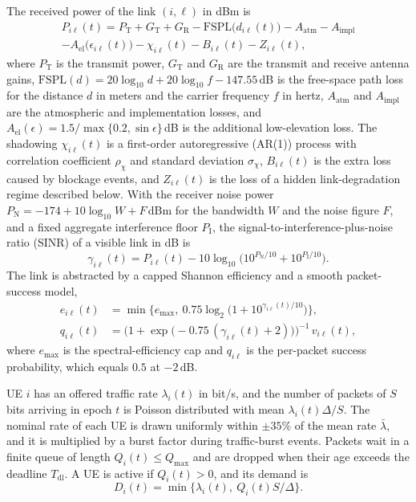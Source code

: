 \documentclass[journal]{IEEEtran}
\begin{document}
The received power of the link $(i,\ell)$ in dBm is
\begin{multline}
P_{i\ell}(t) = P_{\mathrm{T}} + G_{\mathrm{T}} + G_{\mathrm{R}}
 - \mathrm{FSPL}\big(d_{i\ell}(t)\big) - A_{\mathrm{atm}} - A_{\mathrm{impl}} \\
 - A_{\mathrm{el}}\big(\epsilon_{i\ell}(t)\big) - \chi_{i\ell}(t) - B_{i\ell}(t) - Z_{i\ell}(t),
\label{eq:rx}
\end{multline}
where $P_{\mathrm{T}}$ is the transmit power, $G_{\mathrm{T}}$ and
$G_{\mathrm{R}}$ are the transmit and receive antenna gains,
$\mathrm{FSPL}(d)=20\log_{10}d+20\log_{10}f-147.55$\,dB is the free-space
path loss for the distance $d$ in meters and the carrier frequency $f$ in
hertz, $A_{\mathrm{atm}}$ and $A_{\mathrm{impl}}$ are the atmospheric and
implementation losses, and
$A_{\mathrm{el}}(\epsilon)=1.5/\max\{0.2,\sin\epsilon\}$\,dB is the
additional low-elevation loss. The shadowing $\chi_{i\ell}(t)$ is a
first-order autoregressive (AR(1)) process with correlation coefficient
$\rho_\chi$ and standard deviation $\sigma_\chi$, $B_{i\ell}(t)$ is the extra
loss caused by blockage events, and $Z_{i\ell}(t)$ is the loss of a hidden
link-degradation regime described below. With the receiver noise
power $P_{\mathrm{N}}=-174+10\log_{10}W+F$\,dBm for the bandwidth $W$ and the
noise figure $F$, and a fixed aggregate interference floor $P_{\mathrm{I}}$,
the signal-to-interference-plus-noise ratio (SINR) of a visible link in dB is
\begin{equation}
\gamma_{i\ell}(t)=P_{i\ell}(t)-10\log_{10}\!\big(10^{P_{\mathrm{N}}/10}+10^{P_{\mathrm{I}}/10}\big).
\label{eq:sinr}
\end{equation}
The link is abstracted by a capped Shannon efficiency and
a smooth packet-success model,
\begin{align}
e_{i\ell}(t) &= \min\big\{e_{\max},\ 0.75\log_2\!\big(1+10^{\gamma_{i\ell}(t)/10}\big)\big\},\\
q_{i\ell}(t) &= \Big(1+\exp\!\big(-0.75\,(\gamma_{i\ell}(t)+2)\big)\Big)^{-1}\,v_{i\ell}(t),
\label{eq:bler}
\end{align}
where $e_{\max}$ is the spectral-efficiency cap and $q_{i\ell}$ is the
per-packet success probability, which equals $0.5$ at $-2$\,dB.

UE $i$ has an offered traffic rate $\lambda_i(t)$ in bit/s, and the number of
packets of $S$ bits arriving in epoch $t$ is Poisson distributed with mean
$\lambda_i(t)\Delta/S$. The nominal rate of each UE is drawn uniformly within $\pm35\%$
of the mean rate $\bar\lambda$, and it is multiplied by a burst factor during
traffic-burst events. Packets wait in a finite queue of length
$Q_i(t)\le Q_{\max}$ and are dropped when their age exceeds the deadline
$T_{\mathrm{dl}}$. A UE is active if $Q_i(t)>0$, and its demand is
\begin{equation}
D_i(t)=\min\big\{\lambda_i(t),\ Q_i(t)S/\Delta\big\}.
\end{equation}
\end{document}
